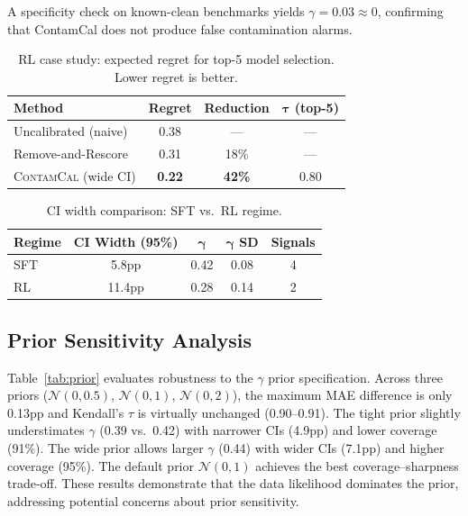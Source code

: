 \documentclass[11pt,letterpaper]{article}
\begin{document}
A specificity check on known-clean benchmarks yields $\gamma = 0.03 \approx 0$, confirming that ContamCal does not produce false contamination alarms.

\begin{table}[t]
\centering
\caption{RL case study: expected regret for top-5 model selection. Lower regret is better.}
\label{tab:rl}
\begin{tabular}{lccc}
\toprule
\textbf{Method} & \textbf{Regret} & \textbf{Reduction} & $\boldsymbol{\tau}$ \textbf{(top-5)} \\
\midrule
Uncalibrated (naive) & 0.38 & --- & --- \\
Remove-and-Rescore & 0.31 & 18\% & --- \\
\textsc{ContamCal} (wide CI) & \textbf{0.22} & \textbf{42\%} & 0.80 \\
\bottomrule
\end{tabular}
\end{table}

\begin{table}[t]
\centering
\caption{CI width comparison: SFT vs.\ RL regime.}
\label{tab:cicomp}
\begin{tabular}{lcccc}
\toprule
\textbf{Regime} & \textbf{CI Width (95\%)} & $\boldsymbol{\gamma}$ & $\boldsymbol{\gamma}$ \textbf{SD} & \textbf{Signals} \\
\midrule
SFT & 5.8pp & 0.42 & 0.08 & 4 \\
RL & 11.4pp & 0.28 & 0.14 & 2 \\
\bottomrule
\end{tabular}
\end{table}

\subsection{Prior Sensitivity Analysis}

Table~\ref{tab:prior} evaluates robustness to the $\gamma$ prior specification.
Across three priors ($\mathcal{N}(0,0.5)$, $\mathcal{N}(0,1)$, $\mathcal{N}(0,2)$), the maximum MAE difference is only 0.13pp and Kendall's $\tau$ is virtually unchanged (0.90--0.91).
The tight prior slightly understimates $\gamma$ (0.39 vs.\ 0.42) with narrower CIs (4.9pp) and lower coverage (91\%).
The wide prior allows larger $\gamma$ (0.44) with wider CIs (7.1pp) and higher coverage (95\%).
The default prior $\mathcal{N}(0,1)$ achieves the best coverage--sharpness trade-off.
These results demonstrate that the data likelihood dominates the prior, addressing potential concerns about prior sensitivity.
\end{document}
